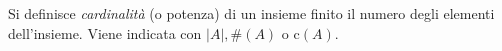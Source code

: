 Si definisce \emph{cardinalità} (o potenza) di un insieme finito il numero degli elementi dell'insieme. Viene indicata con  $\vert A\vert, \#(A)$ o $\text{c}(A)$.

%
%
%
%
%
%
